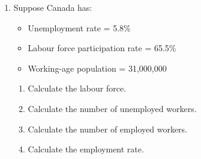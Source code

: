 \documentclass[12pt]{article}
\begin{document}
\begin{enumerate}[label=\textbf{Question \arabic*.}]
\begin{enumerate}[label=(\alph*)]
    \item Calculate the long-term unemployment rate for Country X.
    \item Calculate the long-term unemployment rate for Country Y.
    \item Which country has the more serious long-term unemployment problem?
    \item Explain why two countries with the same unemployment rate may have very different labour market conditions.
\end{enumerate}

\item Suppose Canada has:
\begin{itemize}
    \item Unemployment rate = 5.8\%
    \item Labour force participation rate = 65.5\%
    \item Working-age population = 31{,}000{,}000
\end{itemize}

\begin{enumerate}[label=(\alph*)]
    \item Calculate the labour force.
    \item Calculate the number of unemployed workers.
    \item Calculate the number of employed workers.
    \item Calculate the employment rate.
\end{enumerate}

\end{enumerate}
\end{document}
